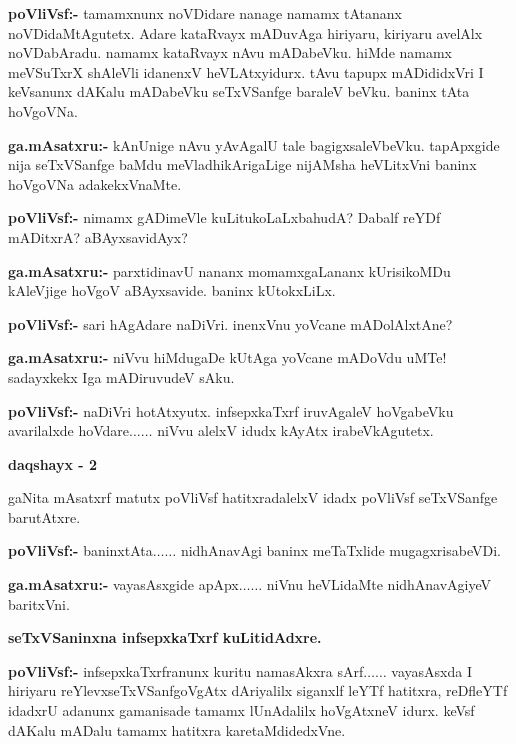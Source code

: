 \smallskip
\noindent
\textbf{poVliVsf:-} tamamxnunx noVDidare nanage namamx tAtananx noVDidaMtAgutetx. Adare kataRvayx mADuvAga hiriyaru, kiriyaru avelAlx noVDabAradu. namamx kataRvayx nAvu mADabeVku. hiMde namamx meVSuTxrX shAleVli idanenxV heVLAtxyidurx. tAvu tapupx mADididxVri I keVsanunx dAKalu mADabeVku seTxVSanfge baraleV beVku. baninx tAta hoVgoVNa.

\smallskip
\noindent
\textbf{ga.mAsatxru:-} kAnUnige nAvu yAvAgalU tale bagigxsaleVbeVku. tapApxgide nija seTxVSanfge baMdu meVladhikArigaLige nijAMsha heVLitxVni baninx hoVgoVNa adakekxVnaMte.

\smallskip
\noindent
\textbf{poVliVsf:-} nimamx gADimeVle kuLitukoLaLxbahudA? Dabalf reYDf mADitxrA? aBAyxsavidAyx?

\smallskip
\noindent
\textbf{ga.mAsatxru:-} parxtidinavU nananx momamxgaLananx kUrisikoMDu kAleVjige hoVgoV aBAyxsavide. baninx kUtokxLiLx.

\smallskip
\noindent
\textbf{poVliVsf:-} sari hAgAdare naDiVri. inenxVnu yoVcane mADolAlxtAne?

\smallskip
\noindent
\textbf{ga.mAsatxru:-} niVvu hiMdugaDe kUtAga yoVcane mADoVdu uMTe! sadayxkekx Iga mADiruvudeV sAku.

\smallskip
\noindent
\textbf{poVliVsf:-} naDiVri hotAtxyutx. infsepxkaTxrf iruvAgaleV hoVgabeVku avarilalxde hoVdare$\ldots\ldots$ niVvu alelxV idudx kAyAtx irabeVkAgutetx.

\begin{center}
{\bf daqshayx - {\rm 2}}
\end{center}

gaNita mAsatxrf matutx poVliVsf hatitxradalelxV idadx poVliVsf seTxVSanfge barutAtxre.

\noindent
\textbf{poVliVsf:-} baninxtAta$\ldots\ldots$ nidhAnavAgi baninx meTaTxlide mugagxrisabeVDi.

\smallskip
\noindent
\textbf{ga.mAsatxru:-} vayasAsxgide apApx$\ldots\ldots$ niVnu heVLidaMte nidhAnavAgiyeV baritxVni.

\newpage
\begin{center}
{\bf seTxVSaninxna infsepxkaTxrf kuLitidAdxre.}
\end{center}

\noindent
\textbf{poVliVsf:-} infsepxkaTxrfranunx kuritu namasAkxra sArf$\ldots\ldots$ vayasAsxda I hiriyaru reYlevxseTxVSanfgoVgAtx dAriyalilx siganxlf leYTf hatitxra, reDfleYTf idadxrU adanunx gamanisade tamamx lUnAdalilx hoVgAtxneV idurx. keVsf dAKalu mADalu tamamx hatitxra karetaMdidedxVne.

